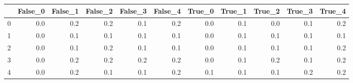 \begin{tabular}{lrrrrrrrrrr}
\toprule
{} &  False\_0 &  False\_1 &  False\_2 &  False\_3 &  False\_4 &  True\_0 &  True\_1 &  True\_2 &  True\_3 &  True\_4 \\ \hline
\midrule
0 &      0.0 &      0.2 &      0.2 &      0.1 &      0.2 &     0.0 &     0.1 &     0.0 &     0.1 &     0.2 \\ \hline
1 &      0.0 &      0.1 &      0.1 &      0.1 &      0.1 &     0.0 &     0.1 &     0.1 &     0.1 &     0.1 \\ \hline
2 &      0.0 &      0.1 &      0.2 &      0.1 &      0.1 &     0.0 &     0.1 &     0.1 &     0.1 &     0.2 \\ \hline
3 &      0.0 &      0.2 &      0.2 &      0.2 &      0.2 &     0.0 &     0.1 &     0.2 &     0.1 &     0.2 \\ \hline
4 &      0.0 &      0.2 &      0.1 &      0.1 &      0.2 &     0.1 &     0.1 &     0.1 &     0.2 &     0.2 \\ \hline
\bottomrule
\end{tabular}
